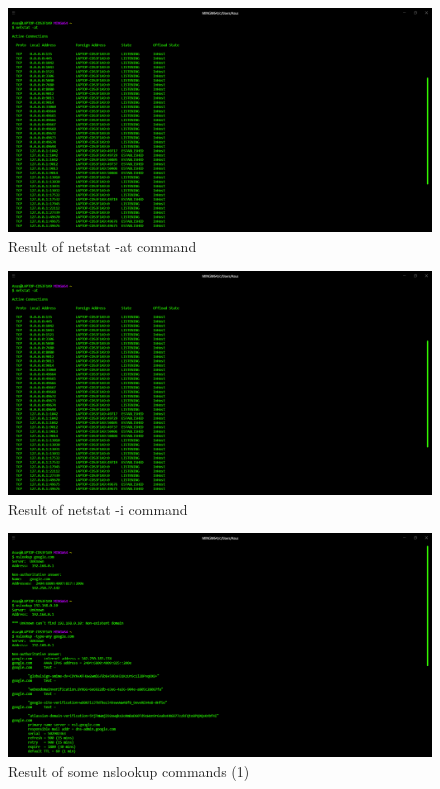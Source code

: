 \documentclass[11pt]{article}
\begin{document}
\begin{figure}
    \centering
    \includegraphics[width=\textwidth]{netstat 2.png}
    \caption{Result of netstat -at command}  
\end{figure}

\begin{figure}
    \centering
    \includegraphics[width=\textwidth]{netstat 2.png}
    \caption{Result of netstat -i command}  
\end{figure}

\begin{figure}
    \centering
    \includegraphics[width=\textwidth]{nslookup 1.png}
    \caption{Result of some nslookup commands (1)}  
\end{figure}
\end{document}
